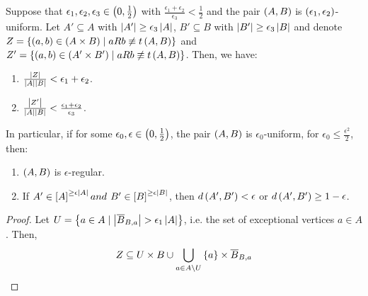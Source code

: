 
    \begin{lemma}[Lemma 5.17] \label{lem:excellence_implies_regularity}
        Suppose that $\epsilon_1, \epsilon_2, \epsilon_3 \in \left( 0, \frac{1}{2} \right)$ with
        $\frac{\epsilon_1 + \epsilon_2}{\epsilon_3} < \frac{1}{2}$ and the pair $\left( A,B \right)$ is
        $\left( \epsilon_1, \epsilon_2 \right)$-uniform.
        Let $A' \subseteq A$ with $\left| A' \right| \geq \epsilon_3 \left| A \right|$,
        $B' \subseteq B$ with $\left| B' \right| \geq \epsilon_3 \left| B \right|$ and
        denote $Z = \left\{ \left( a,b \right) \in \left( A \times B \right) \mid a R b \not\equiv t\left( A,B \right) \right\}$ and
        $Z' = \left\{ \left( a,b \right) \in \left( A' \times B' \right) \mid a R b \not\equiv t\left( A,B \right) \right\}$.
        Then, we have:
        \begin{enumerate}
            \item \label{itm:excellence_implies_regularity.1} $\frac{\left| Z \right|}{{\left| A \right| \left| B \right|}} < \epsilon_1 + \epsilon_2$.
            \item \label{itm:excellence_implies_regularity.2} $\frac{\left| Z' \right|}{\left| A \right| \left| B \right|} <
                \frac{\epsilon_1 + \epsilon_2}{\epsilon_3}$.
        \end{enumerate}
        In particular, if for some $\epsilon_0, \epsilon \in \left( 0, \frac{1}{2} \right)$, the pair
        $\left( A,B \right)$ is $\epsilon_0$-uniform, for $\epsilon_0 \leq \frac{\epsilon^2}{2}$, then:
        \begin{enumerate}[label=\alph*., ref=\alph*]
            \item \label{itm:excellence_implies_regularity.a} $\left( A,B \right)$ is $\epsilon$-regular.
            \item \label{itm:excellence_implies_regularity.b} If $A' \in \left[ A \right]^{\geq \epsilon \left| A \right|} and $
                $B' \in \left[ B \right]^{\geq \epsilon \left| B \right|}$, then $d \left( A',B' \right) < \epsilon$ or
                $d \left( A',B' \right) \geq 1 - \epsilon$.
        \end{enumerate}
        \begin{proof}
            Let $U = \left\{ a \in A \mid \left| \overline{B}_{B,a} \right| > \epsilon_1 \left| A \right| \right\}$, i.e. the set
            of exceptional vertices $a \in A$.
            Then,
            \[
                Z \subseteq U \times B \cup \bigcup_{a \in A \setminus U} \left\{ a \right\} \times \overline{B}_{B,a}
\]
\end{proof}
\end{lemma}
